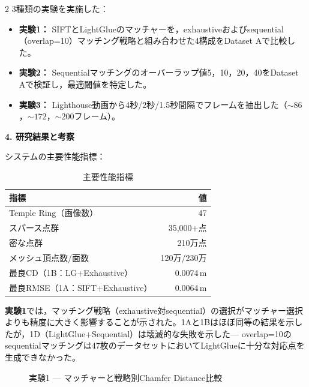 \begin{multicols}{2}
3種類の実験を実施した：
\begin{itemize}
    \item \textbf{実験1：} SIFTとLightGlueのマッチャーを，exhaustiveおよびsequential（overlap=10）マッチング戦略と組み合わせた4構成をDataset Aで比較した。
    \item \textbf{実験2：} Sequentialマッチングのオーバーラップ値5，10，20，40をDataset Aで検証し，最適閾値を特定した。
    \item \textbf{実験3：} Lighthouse動画から4秒/2秒/1.5秒間隔でフレームを抽出した（${\sim}86$，${\sim}172$，${\sim}200$フレーム）。
\end{itemize}

\noindent\textbf{4. 研究結果と考察}

システムの主要性能指標：

\begin{table}[H]
\centering
\caption{主要性能指標}
\label{tab:summary_jp_results}
\scriptsize
\setlength{\tabcolsep}{3pt}
\begin{tabular}{|l|r|}
\hline
\textbf{指標} & \textbf{値} \\ \hline
Temple Ring（画像数） & 47 \\ \hline
スパース点群 & 35{,}000+点 \\ \hline
密な点群 & 210万点 \\ \hline
メッシュ頂点数/面数 & 120万/230万 \\ \hline
最良CD（1B：LG+Exhaustive） & 0.0074\,m \\ \hline
最良RMSE（1A：SIFT+Exhaustive） & 0.0064\,m \\ \hline
\end{tabular}
\end{table}

\textbf{実験1}では，マッチング戦略（exhaustive対sequential）の選択がマッチャー選択よりも精度に大きく影響することが示された。1Aと1Bはほぼ同等の結果を示したが，1D（LightGlue+Sequential）は壊滅的な失敗を示した--- overlap=10のsequentialマッチングは47枚のデータセットにおいてLightGlueに十分な対応点を生成できなかった。
\end{multicols}

\begin{figure}[H]
\centering
{}
\caption{実験1 --- マッチャーと戦略別Chamfer Distance比較}
\label{fig:jp_exp1_cd}
\end{figure}


